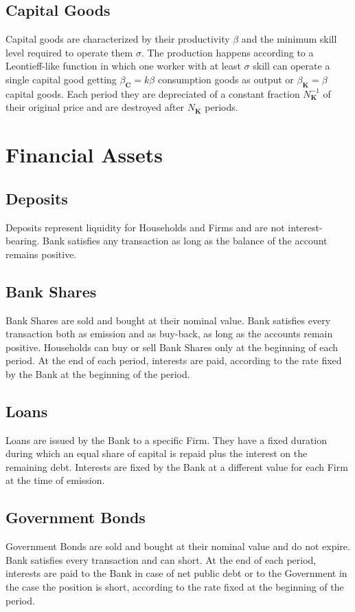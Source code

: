 \documentclass[a4paper, headings=standardclasses]{scrartcl}
\numberwithin{equation}{subsection}
\begin{document}
\subsection{Capital Goods}
Capital goods are characterized by their productivity $\beta$ and the minimum skill level required to operate them $\sigma$. The production happens according to a Leontieff-like function in which one worker with at least $\sigma$ skill can operate a single capital good getting $\beta_\mathbf{C}=k \beta$ consumption goods as output or $\beta_\mathbf{K} = \beta$ capital goods. Each period they are depreciated of a constant fraction $N_\mathbf{K}^{-1}$ of their original price and are destroyed after $N_\mathbf{K}$ periods.

\section{Financial Assets}

\subsection{Deposits}
Deposits represent liquidity for Households and Firms and are not interest-bearing. Bank satisfies any transaction as long as the balance of the account remains positive.

\subsection{Bank Shares}
Bank Shares are sold and bought at their nominal value. Bank satisfies every transaction both as emission and as buy-back, as long as the accounts remain positive. Households can buy or sell Bank Shares only at the beginning of each period. At the end of each period, interests are paid, according to the rate fixed by the Bank at the beginning of the period.

\subsection{Loans}
Loans are issued by the Bank to a specific Firm. They have a fixed duration during which an equal share of capital is repaid plus the interest on the remaining debt. Interests are fixed by the Bank at a different value for each Firm at the time of emission.

\subsection{Government Bonds}
Government Bonds are sold and bought at their nominal value and do not expire. Bank satisfies every transaction and can short. At the end of each period, interests are paid to the Bank in case of net public debt or to the Government in the case the position is short, according to the rate fixed at the beginning of the period.
\end{document}
